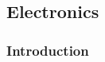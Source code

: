 



\subsection{Electronics}
\label{sec:fdsp-pd-pde}

\subsubsection{Introduction}
\label{sec:fdsp-pd-elec-intro}





